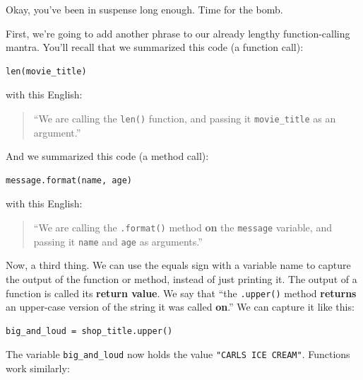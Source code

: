 \label{returnValues}
Okay, you've been in suspense long enough. Time for the bomb.

First, we're going to add another phrase to our already lengthy
function-calling mantra. You'll recall that we summarized this code (a function
call):

\begin{Verbatim}[fontsize=\small,samepage=true,frame=single,framesep=3mm]
len(movie_title)
\end{Verbatim}

with this English:

\begin{quote}
``We are calling the \texttt{len()} function, and passing it
\texttt{movie\_title} as an argument.''
\end{quote}

And we summarized this code (a method call):

\begin{Verbatim}[fontsize=\small,samepage=true,frame=single,framesep=3mm]
message.format(name, age)
\end{Verbatim}

with this English:

\begin{quote}
``We are calling the \texttt{.format()} method \textbf{on} the \texttt{message}
variable, and passing it \texttt{name} and \texttt{age} as arguments.''
\end{quote}

Now, a third thing. We can use the equals sign with a variable name to
capture the output of the function or method, instead of just printing it. The
output of a function is called its \textbf{return value}. We say that ``the
\texttt{.upper()} method \textbf{returns} an upper-case version of the string
it was called \textbf{on}.'' We can capture it like this:

\begin{Verbatim}[fontsize=\small,samepage=true,frame=single,framesep=3mm]
big_and_loud = shop_title.upper()
\end{Verbatim}

The variable \texttt{big\_and\_loud} now holds the value
\texttt{"CARL\textquotesingle S ICE CREAM"}. Functions work similarly:

